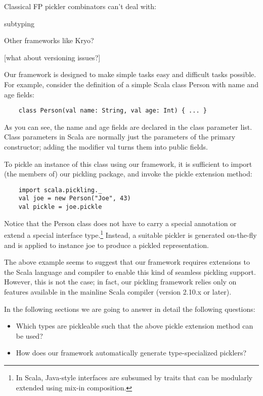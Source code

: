 \documentclass[preprint,10pt]{sigplanconf}
\theoremstyle{definition}
\begin{document}
Classical FP pickler combinators can't deal with:

subtyping


Other frameworks like Kryo?

[what about versioning issues?]

Our framework is designed to make simple tasks easy and difficult tasks possible. For example, consider the definition of a simple Scala class Person with name and age fields:

\begin{verbatim}
    class Person(val name: String, val age: Int) { ... }
\end{verbatim}

As you can see, the name and age fields are declared in the class parameter list. Class parameters in Scala are normally just the parameters of the primary constructor; adding the modifier val turns them into public fields.

To pickle an instance of this class using our framework, it is sufficient to import (the members of) our pickling package, and invoke the pickle extension method:

\begin{verbatim}
    import scala.pickling._
    val joe = new Person("Joe", 43)
    val pickle = joe.pickle
\end{verbatim}

Notice that the Person class does not have to carry a special annotation or extend a special interface type.\footnote{In Scala, Java-style interfaces are subsumed by traits that can be modularly extended using mix-in composition.} Instead, a suitable pickler is generated on-the-fly and is applied to instance joe to produce a pickled representation.

The above example seems to suggest that our framework requires extensions to the Scala language and compiler to enable this kind of seamless pickling support. However, this is not the case; in fact, our pickling framework relies only on features available in the mainline Scala compiler (version 2.10.x or later).

In the following sections we are going to answer in detail the following questions:

\begin{itemize}
\item Which types are pickleable such that the above pickle extension method can be used?
\item How does our framework automatically generate type-specialized picklers?
\end{itemize}
\end{document}
